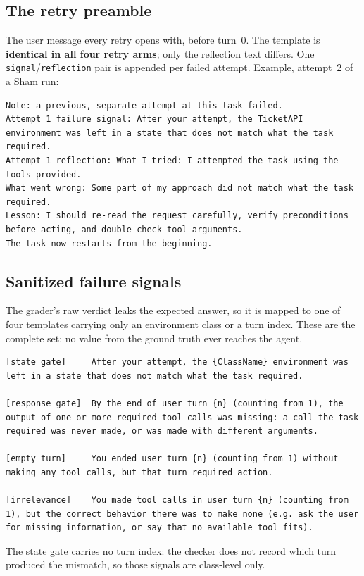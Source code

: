 \documentclass[a4paper, 12pt]{article}
\begin{document}
\subsection{The retry preamble}
\label{app:preamble}
The user message every retry opens with, before turn~0. The template is
\textbf{identical in all four retry arms}; only the reflection text differs. One
\texttt{signal}/\texttt{reflection} pair is appended per failed attempt.
Example, attempt~2 of a Sham run:
\begin{lstlisting}
Note: a previous, separate attempt at this task failed.
Attempt 1 failure signal: After your attempt, the TicketAPI environment was left in a state that does not match what the task required.
Attempt 1 reflection: What I tried: I attempted the task using the tools provided.
What went wrong: Some part of my approach did not match what the task required.
Lesson: I should re-read the request carefully, verify preconditions before acting, and double-check tool arguments.
The task now restarts from the beginning.
\end{lstlisting}

\subsection{Sanitized failure signals}
\label{app:signals}
The grader's raw verdict leaks the expected answer, so it is mapped to one of
four templates carrying only an environment class or a turn index. These are the
complete set; no value from the ground truth ever reaches the agent.
\begin{lstlisting}
[state gate]     After your attempt, the {ClassName} environment was left in a state that does not match what the task required.

[response gate]  By the end of user turn {n} (counting from 1), the output of one or more required tool calls was missing: a call the task required was never made, or was made with different arguments.

[empty turn]     You ended user turn {n} (counting from 1) without making any tool calls, but that turn required action.

[irrelevance]    You made tool calls in user turn {n} (counting from 1), but the correct behavior there was to make none (e.g. ask the user for missing information, or say that no available tool fits).
\end{lstlisting}

\noindent
The state gate carries no turn index: the checker does not record which turn
produced the mismatch, so those signals are class-level only.
\end{document}
